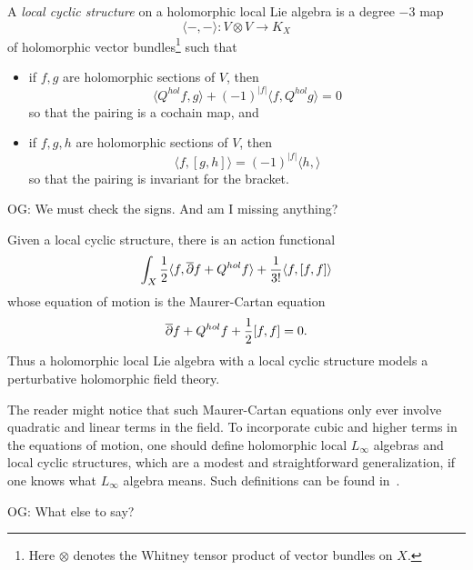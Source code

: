 \documentclass[11pt]{amsart}
\def\owen#1{{\textcolor{violet!50!black}{OG: {#1}}}}
\begin{document}
\begin{dfn}
A {\em local cyclic structure} on a holomorphic local Lie algebra is a degree $-3$ map
\[
\langle -,-\rangle: V \otimes V \to K_X
\]
of holomorphic vector bundles\footnote{Here $\otimes$ denotes the Whitney tensor product of vector bundles on $X$.} such that 
\begin{itemize}
\item if $f, g$ are holomorphic sections of $V$, then 
\[
\langle Q^{hol}f, g \rangle + (-1)^{|f|} \langle f, Q^{hol} g \rangle = 0
\]
so that the pairing is a cochain map, and
\item if $f, g, h$ are holomorphic sections of $V$, then 
\[
\langle f, [g,h] \rangle = (-1)^{|f|} \langle h,  \rangle
\]
so that the pairing is invariant for the bracket.
\end{itemize}
\owen{We must check the signs. And am I missing anything?}
\end{dfn}

Given a local cyclic structure, there is an action functional
\[
\int_X \frac{1}{2} \langle f, {\overline{\partial}} f + Q^{hol} f \rangle + \frac{1}{3!} \langle f, [f,f] \rangle 
\]
whose equation of motion is the Maurer-Cartan equation
\[
{\overline{\partial}} f + Q^{hol}f + \frac{1}{2} [f,f] = 0.
\]
Thus a holomorphic local Lie algebra with a local cyclic structure models a perturbative holomorphic field theory.

The reader might notice that such Maurer-Cartan equations only ever involve quadratic and linear terms in the field.
To incorporate cubic and higher terms in the equations of motion,
one should define holomorphic local $L_\infty$ algebras and local cyclic structures,
which are a modest and straightforward generalization, if one knows what $L_\infty$ algebra means.
Such definitions can be found in~\cite{CG2}.

\owen{What else to say?}

%


\end{document}
